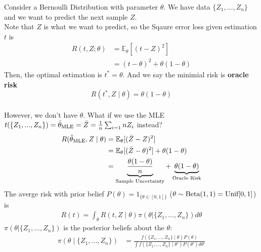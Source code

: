 \documentclass[11pt]{elegantbook}
\begin{document}
\begin{example}\label{ex:square_loss}
    Consider a Bernoulli Distribution with parameter $\theta$. We have data $\{Z_1,...,Z_n\}$ and we want to predict the next sample $Z$.\\
    Note that $Z$ is what we want to predict, so the Sqaure error loss given estimation $t$ is
    \begin{equation}
        \begin{aligned}
            R(t,Z;\theta)&=\mathbb{E}_\theta[(t-Z)^2]\\
            &=(t-\theta)^2+\theta(1-\theta)
        \end{aligned}
        \nonumber
    \end{equation}
    Then, the optimal estimation is $t^*=\theta$. And we say the minimial risk is \textbf{oracle risk} $$R(t^*,Z\mid\theta)=\theta(1-\theta)$$\\
    However, we don't have $\theta$. What if we use the MLE $t(\{Z_1,...,Z_n\})=\hat{\theta}_\textnormal{MLE}=\bar{Z}=\frac{1}{n}\sum_{i=1}{n}Z_i$ instead?
    \begin{equation}
        \begin{aligned}
            R(\hat{\theta}_\textnormal{MLE},Z\mid \theta)&=\mathbb{E}_\theta[(\bar{Z}-Z)^2]\\
            &=\mathbb{E}_\theta[(\bar{Z}-\theta)^2]+\theta(1-\theta)\\
            &=\underbrace{\frac{\theta(1-\theta)}{n}}_\textnormal{Sample Uncertainty}+\underbrace{\theta(1-\theta)}_\textnormal{Oracle Risk}
        \end{aligned}
        \nonumber
    \end{equation}
    The averge risk with prior belief $P(\theta)=1_{\{\theta\in[0,1]\}}$ ($\theta\sim \textnormal{Beta}(1,1)=\textnormal{Unif}[0,1]$) is
    \begin{equation}
        \begin{aligned}
            R(t)=\int_\theta R(t,Z\mid \theta) \pi(\theta| \{Z_1,...,Z_n\}) d\theta
        \end{aligned}
        \nonumber
    \end{equation}
    $\pi(\theta| \{Z_1,...,Z_n\})$ is the posterior beliefs about the $\theta$:
    \begin{equation}
        \begin{aligned}
            \pi(\theta\mid \{Z_1,...,Z_n\})&=\frac{f(\{Z_1,...,Z_n\}\mid \theta)P(\theta)}{\int f(\{Z_1,...,Z_n\}\mid \theta')P(\theta')d\theta'}

\end{aligned}
\end{equation}
\end{example}
\end{document}
